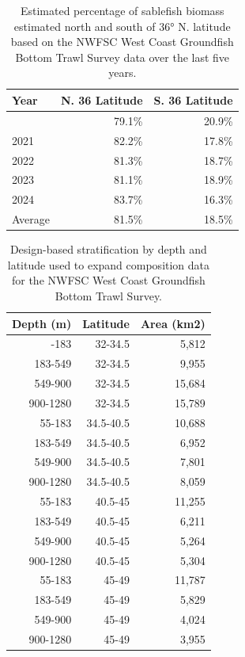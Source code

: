 \documentclass[
  english,
]{article}
\begin{document}
\endgroup

\pagebreak

\begingroup
\fontsize{9.0pt}{11.0pt}\selectfont

\begin{longtable}{lrr}

\caption{\label{tbl-prop-area}Estimated percentage of sablefish biomass
estimated north and south of 36° N. latitude based on the NWFSC West
Coast Groundfish Bottom Trawl Survey data over the last five years.}

\tabularnewline

\toprule
Year & N. 36 Latitude & S. 36 Latitude \\ 
\midrule\addlinespace[2.5pt]
2019 & 79.1\% & 20.9\% \\ 
2021 & 82.2\% & 17.8\% \\ 
2022 & 81.3\% & 18.7\% \\ 
2023 & 81.1\% & 18.9\% \\ 
2024 & 83.7\% & 16.3\% \\ 
Average & 81.5\% & 18.5\% \\ 
\bottomrule

\end{longtable}

\endgroup

\pagebreak

\begingroup
\fontsize{9.0pt}{11.0pt}\selectfont

\begin{longtable}{rrr}

\caption{\label{tbl-wcgbt-strata}Design-based stratification by depth
and latitude used to expand composition data for the NWFSC West Coast
Groundfish Bottom Trawl Survey.}

\tabularnewline

\toprule
Depth (m) & Latitude & Area (km2) \\ 
\midrule\addlinespace[2.5pt]
55-183 & 32-34.5 & 5,812 \\ 
183-549 & 32-34.5 & 9,955 \\ 
549-900 & 32-34.5 & 15,684 \\ 
900-1280 & 32-34.5 & 15,789 \\ 
55-183 & 34.5-40.5 & 10,688 \\ 
183-549 & 34.5-40.5 & 6,952 \\ 
549-900 & 34.5-40.5 & 7,801 \\ 
900-1280 & 34.5-40.5 & 8,059 \\ 
55-183 & 40.5-45 & 11,255 \\ 
183-549 & 40.5-45 & 6,211 \\ 
549-900 & 40.5-45 & 5,264 \\ 
900-1280 & 40.5-45 & 5,304 \\ 
55-183 & 45-49 & 11,787 \\ 
183-549 & 45-49 & 5,829 \\ 
549-900 & 45-49 & 4,024 \\ 
900-1280 & 45-49 & 3,955 \\ 
\bottomrule

\end{longtable}
\end{document}
